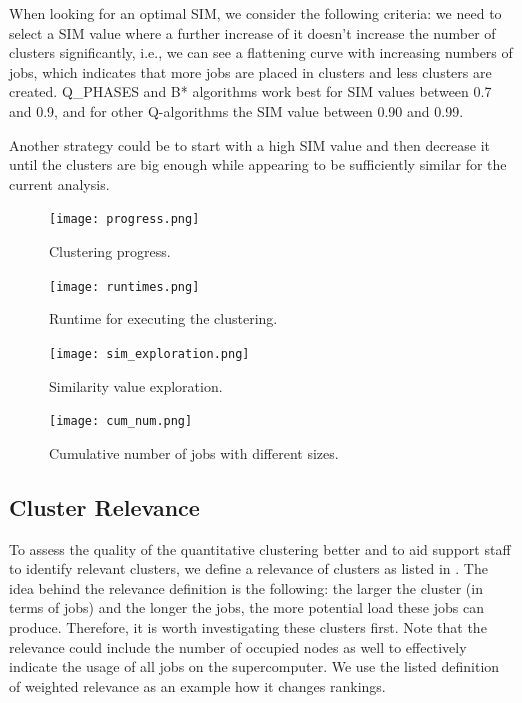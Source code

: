 \documentclass{jhps}
\begin{document}
When looking for an optimal SIM, we consider the following criteria:
we need to select a SIM value where a further increase of it doesn't increase the number of clusters significantly, i.e., we can see a flattening curve with increasing numbers of jobs, which indicates that more jobs are placed in clusters and less clusters are created.
Q\_PHASES and B* algorithms work best for SIM values between 0.7 and 0.9, and for other Q-algorithms the SIM value between 0.90 and 0.99.

Another strategy could be to start with a high SIM value and then decrease it until the clusters are big enough while appearing to be sufficiently similar for the current analysis.

\begin{figure}
  \centering
   \texttt{[image: progress.png]}
   \caption{Clustering progress.}
   \label{fig:clustering_progress}
\end{figure}

\begin{figure}
  \centering
  \texttt{[image: runtimes.png]}
  \caption{Runtime for executing the clustering.}
  \label{fig:alg_runtimes}
\end{figure}


\begin{figure}
  \centering
  \texttt{[image: sim\_exploration.png]}
  \caption{Similarity value exploration.}
  \label{fig:sim_exploration}
\end{figure}

\begin{figure}
  \centering
  \texttt{[image: cum\_num.png]}
  \caption{Cumulative number of jobs with different sizes.}
  \label{fig:cum_num_job_sizes}
\end{figure}

\subsection{Cluster Relevance}

To assess the quality of the quantitative clustering better and to aid support staff to identify relevant clusters, we define a relevance of clusters as listed in .
The idea behind the relevance definition is the following: the larger the cluster (in terms of jobs) and the longer the jobs, the more potential load these jobs can produce.
Therefore, it is worth investigating these clusters first.
Note that the relevance could include the number of occupied nodes as well to effectively indicate the usage of all jobs on the supercomputer.
We use the listed definition of weighted relevance as an example how it changes rankings.
\end{document}

